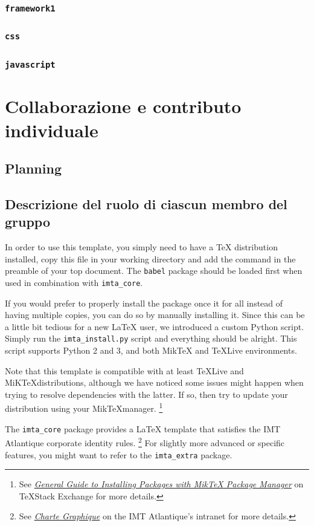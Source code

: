 \documentclass{report}
\begin{document}
\subsection{\texttt{framework1} }
\subsection{\texttt{css} }
\subsection{\texttt{javascript} }

\chapter{Collaborazione e contributo individuale}
\section{Planning}
\section{Descrizione del ruolo di ciascun membro del gruppo}

In order to use this template, you simply need to have a \TeX{} distribution installed, copy this file in your working directory and add the  command in the preamble of your top document. 
The \texttt{babel} package should be loaded first when used in combination with \texttt{imta\_core}.

If you would prefer to properly install the package once it for all instead of having multiple copies, you can do so by manually installing it. 
Since this can be a little bit tedious for a new \LaTeX{} user, we introduced a custom Python script. 
Simply run the \texttt{imta\_install.py} script and everything should be alright.
This script supports Python 2 and 3, and both Mik\TeX{} and \TeX{}Live environments. 

Note that this template is compatible with at least \TeX Live and MiK\TeX distributions, although we have noticed some issues might happen when trying to resolve dependencies with the latter. 
If so, then try to update your distribution using your Mik\TeX manager.
\footnote{See \textit{\href{https://tex.stackexchange.com/a/359851}{General Guide to Installing Packages with MikTeX Package Manager}} on \TeX Stack Exchange for more details.}


The \texttt{imta\_core} package provides a \LaTeX{} template that satisfies the IMT Atlantique corporate identity rules.
\footnote{See \textit{\href{https://intranet.imt-atlantique.fr/wp-content/uploads/2017/01/imt_atlantique_chartegraphique.pdf}{Charte Graphique}} on the IMT Atlantique's intranet for more details.} 
For slightly more advanced or specific features, you might want to refer to the \texttt{imta\_extra} package.
\end{document}
